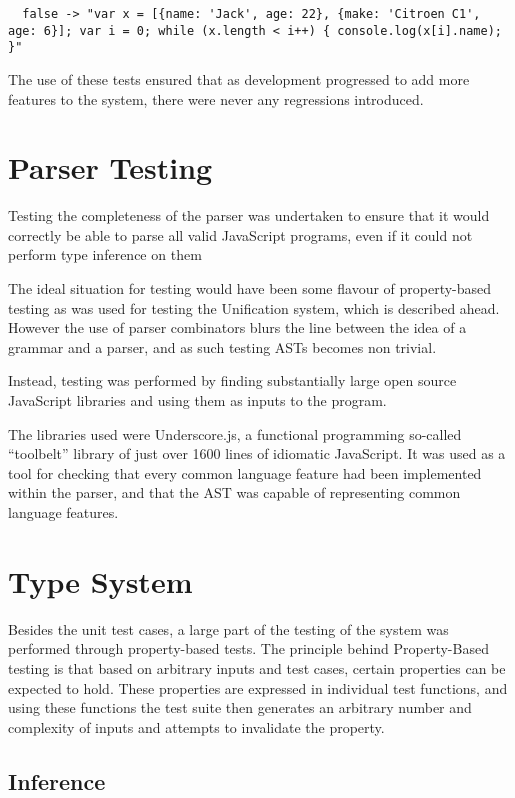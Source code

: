 \documentclass[british, twoside, openright]{bhamthesis}
\theoremstyle{definition}
\begin{document}
    \begin{lstlisting}
  false -> "var x = [{name: 'Jack', age: 22}, {make: 'Citroen C1', age: 6}]; var i = 0; while (x.length < i++) { console.log(x[i].name); }"
    \end{lstlisting}

    The use of these tests ensured that as development progressed to add more features to the system, there were never any regressions introduced.

  \section{Parser Testing}
    Testing the completeness of the parser was undertaken to ensure that it would correctly be able to parse all valid JavaScript programs, even if it could not perform type inference on them

    The ideal situation for testing would have been some flavour of property-based testing as was used for testing the Unification system, which is described ahead. However the use of parser combinators blurs the line between the idea of a grammar and a parser, and as such testing ASTs becomes non trivial.

    Instead, testing was performed by finding substantially large open source JavaScript libraries and using them as inputs to the program.

    The libraries used were Underscore.js, a functional programming so-called ``toolbelt'' library of just over 1600 lines of idiomatic JavaScript. It was used as a tool for checking that every common language feature had been implemented within the parser, and that the AST was capable of representing common language features.

  \section{Type System}
    Besides the unit test cases, a large part of the testing of the system was performed through property-based tests. The principle behind Property-Based testing\autocite{Fink1997} is that based on arbitrary inputs and test cases, certain properties can be expected to hold. These properties are expressed in individual test functions, and using these functions the test suite then generates an arbitrary number and complexity of inputs and attempts to invalidate the property.

    \subsection{Inference}
\end{document}
